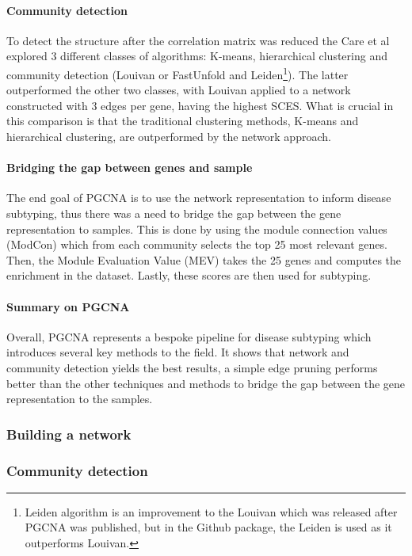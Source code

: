 \paragraph{Community detection}

To detect the structure after the correlation matrix was reduced the Care et al explored 3 different classes of algorithms: K-means, hierarchical clustering and community detection (Louivan\citet{Blondel2008-ik} or FastUnfold and Leiden\citet{Traag2019-ne}\footnote{Leiden algorithm is an improvement to the Louivan which was released after PGCNA was published, but in the Github package, the Leiden is used as it outperforms Louivan.}). The latter outperformed the other two classes, with Louivan applied to a network constructed with 3 edges per gene, having the highest SCES. What is crucial in this comparison is that the traditional clustering methods, K-means and hierarchical clustering, are outperformed by the network approach.

\paragraph{Bridging the gap between genes and sample}

The end goal of PGCNA is to use the network representation to inform disease subtyping, thus there was a need to bridge the gap between the gene representation to samples. This is done by using the module connection values (ModCon) which from each community selects the top 25 most relevant genes. Then, the Module Evaluation Value (MEV) takes the 25 genes and computes the enrichment in the dataset. Lastly, these scores are then used for subtyping.

\paragraph{Summary on PGCNA}

Overall, PGCNA represents a bespoke pipeline for disease subtyping which introduces several key methods to the field. It shows that network and community detection yields the best results, a simple edge pruning performs better than the other techniques and methods to bridge the gap between the gene representation to the samples.

\subsubsection{Building a network}

\subsubsection{Community detection}



